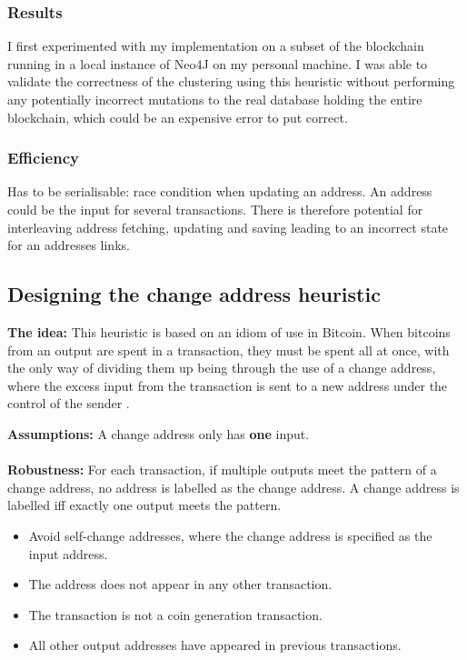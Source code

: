 \subsubsection{Results}
I first experimented with my implementation on a subset of the blockchain running in a local instance of Neo4J on my personal machine. I was able to validate the correctness of the clustering using this heuristic without performing any potentially incorrect mutations to the real database holding the entire blockchain, which could be an expensive error to put correct. 





\subsubsection{Efficiency}
Has to be serialisable: race condition when updating an address. An address could be the input for several transactions. There is therefore potential for interleaving address fetching, updating and saving leading to an incorrect state for an addresses links.  

\subsection{Designing the change address heuristic}
\textbf{The idea:} This heuristic is based on an idiom of use in Bitcoin. When bitcoins from an output are spent in a transaction, they must be spent all at once, with the only way of dividing them up being through the use of a change address, where the excess input from the transaction is sent to a new address under the control of the sender .

\textbf{Assumptions:} A change address only has \textbf{one} input. \\\\
\textbf{Robustness:} 
For each transaction, if multiple outputs meet the pattern of a change address, no address is labelled as the change address. A change address is labelled iff exactly one output meets the pattern. 
\begin{itemize}
    \item Avoid self-change addresses, where the change address is specified as the input address. 
    \item The address does not appear in any other transaction.
    \item The transaction is not a coin generation transaction. 
    \item All other output addresses have appeared in previous transactions.
\end{itemize}






